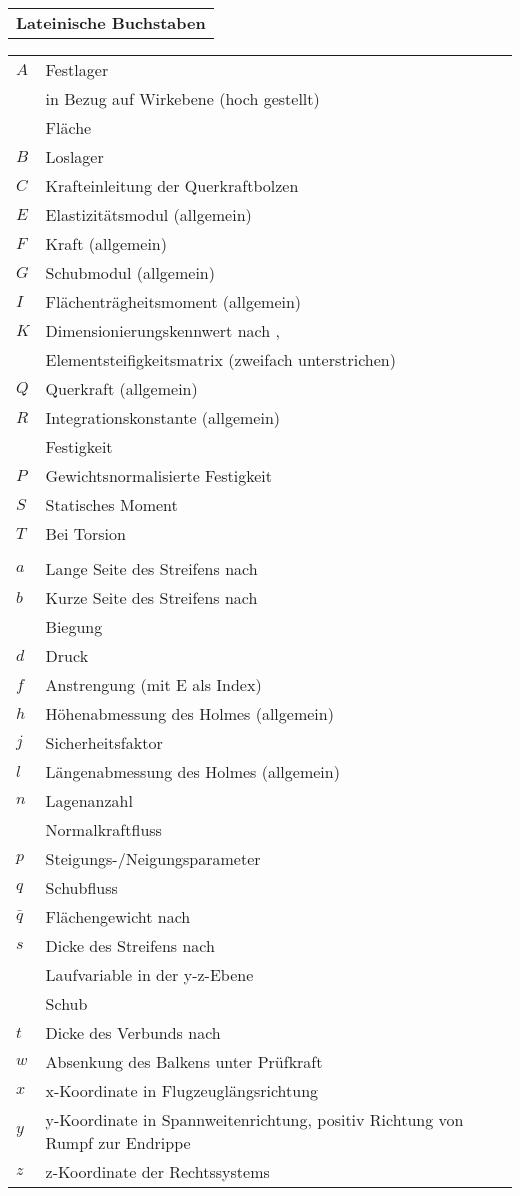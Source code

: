 \begin{longtable}[l]{l}
\onehalfspacing
\textbf{Lateinische Buchstaben}
\end{longtable}
\begin{longtable}[l]{ll}
\onehalfspacing
$ A $&Festlager\\
&in Bezug auf Wirkebene (hoch gestellt)\\
&Fläche\\
$ B $&Loslager\\
$ C $&Krafteinleitung der Querkraftbolzen\\
$ E $&Elastizitätsmodul (allgemein)\\
$ F $&Kraft (allgemein)\\
$ G $&Schubmodul (allgemein)\\
$ I $&Flächenträgheitsmoment (allgemein)\\
$ K $&Dimensionierungskennwert nach \cite{item5},\\
 &Elementsteifigkeitsmatrix (zweifach unterstrichen)\\
$ Q $&Querkraft (allgemein)\\
$ R $&Integrationskonstante (allgemein)\\
&Festigkeit\\
$ P $&Gewichtsnormalisierte Festigkeit\\
$ S $&Statisches Moment\\
$ T $&Bei Torsion\\
& \\
$ a $&Lange Seite des Streifens nach \cite{item1}\\
$ b $&Kurze Seite des Streifens nach \cite{item1}\\
&Biegung\\
$ d$& Druck\\
$ f $&Anstrengung (mit E als Index)\\
$ h $&Höhenabmessung des Holmes (allgemein)\\
$ j $&Sicherheitsfaktor\\
$ l $&Längenabmessung des Holmes (allgemein)\\
$ n $&Lagenanzahl\\
&Normalkraftfluss\\
$ p $&Steigungs-/Neigungsparameter\\
$ q $&Schubfluss\\
$ \bar{q} $&Flächengewicht nach \cite{item5}\\
$ s $&Dicke des Streifens nach \cite{item1}\\
&Laufvariable in der y-z-Ebene\\
& Schub\\
$ t $&Dicke des Verbunds nach \cite{item3}\\
$ w $&Absenkung des Balkens unter Prüfkraft\\
$ x $&x-Koordinate in Flugzeuglängsrichtung\\
$ y $&y-Koordinate in Spannweitenrichtung, positiv Richtung von Rumpf zur Endrippe\\
$ z $&z-Koordinate der Rechtssystems\\
\end{longtable}
